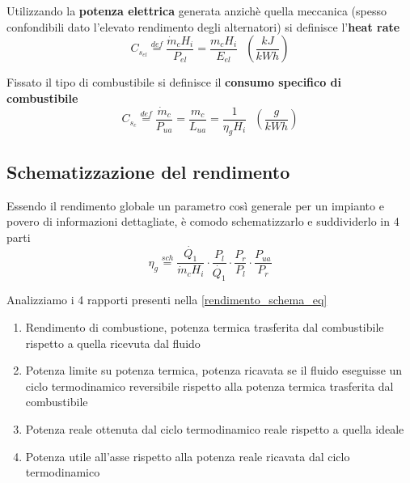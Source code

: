 \documentclass[a4paper,10pt]{article}
\begin{document}
Utilizzando la \textbf{potenza elettrica} generata anzichè quella meccanica
(spesso confondibili dato l'elevato rendimento degli alternatori) si definisce
l'\textbf{heat rate}
\begin{equation}
 C_{s_{el}} \stackrel{def}{=} \frac{\dot{m}_c H_i}{P_{el}} = \frac{m_c H_i}{E_{el}} \ \ \ \left(\frac{kJ}{kWh} \right)
\end{equation}

Fissato il tipo di combustibile si definisce il \textbf{consumo specifico di combustibile}
\begin{equation}
C_{s_c} \stackrel{def}{=} \frac{\dot{m}_c}{P_{ua}} = \frac{m_c}{L_{ua}} = \frac{1}{\eta_gH_i} \ \ \ \left(\frac{g}{kWh} \right)
\end{equation}
\subsection*{Schematizzazione del rendimento}
\label{sec:rendimento_schema}
Essendo il rendimento globale un parametro così generale per un impianto e povero
di informazioni dettagliate, è comodo schematizzarlo e suddividerlo in 4 parti
\begin{equation}
\label{rendimento_schema_eq}
 \eta_g \stackrel{sch}{=} \frac{\dot{Q_1}}{\dot{m}_c H_i}\cdot \frac{P_l}{\dot{Q_1}}\cdot \frac{P_r}{P_l}\cdot \frac{P_{ua}}{P_r}
\end{equation}

Analizziamo i 4 rapporti presenti nella \eqref{rendimento_schema_eq}
\begin{enumerate}
\item Rendimento di combustione, potenza termica trasferita dal combustibile rispetto
a quella ricevuta dal fluido
\item Potenza limite su potenza termica, potenza ricavata se il fluido eseguisse un 
ciclo termodinamico reversibile rispetto alla potenza termica trasferita dal
combustibile
\item Potenza reale ottenuta dal ciclo termodinamico reale rispetto a quella ideale
\item Potenza utile all'asse rispetto alla potenza reale ricavata dal ciclo
termodinamico
\end{enumerate}
\end{document}
